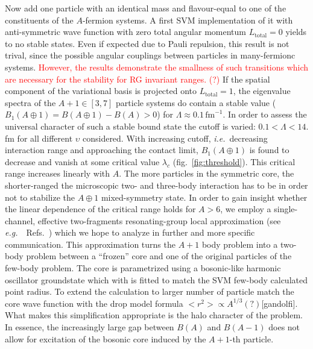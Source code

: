 \documentclass[preprint,12pt]{elsarticle}
\newcommand{\lc}{\ensuremath{\lambda_c}}
\newcommand{\fm}{\ensuremath{\,\text{fm}^{-1}}}
\newcommand{\red}[1]{\textcolor{red}{#1}}
\newcommand{\eg}{\textit{e.g.}~}
\newcommand{\ie}{\textit{i.e.}~}
\newcommand{\figref}[1]{fig.~\ref{#1}}
\begin{document}
Now add one particle with an identical mass and flavour-equal to one of the constituents of the $A$-fermion systems.
A first SVM implementation of it with anti-symmetric wave function with zero total angular momentum $L_\text{total}=0$ yields to no stable states.
Even if expected due to Pauli repulsion, this result is not trival, since the possible angular couplings between particles in many-fermionc systems.
\red{However, the results demonstrate the smallness of such transitions which are necessary for the stability for RG invariant ranges. (?)}
If the spatial component of the variational basis is projected onto $L_\text{total}=1$, the eigenvalue spectra of the $A+1\in[3,7]$ particle systems do contain a stable value ($B_1(A\oplus 1)=B(A\oplus 1)-B(A)>0$) for $\Lambda\approx0.1\fm$.
In order to assess the universal character of such a stable bound state the cutoff is varied: $0.1<\Lambda<14.$ fm for all different $\upsilon$ considered.
With increasing cutoff, \ie decreasing interaction range and approaching the 
contact limit, $B_1(A\oplus 1)$ is found to decrease
and vanish at some critical value $\lc$ (\figref{fig:threshold}). 
%
%
%
%
%
%
%
%
This critical range increases linearly with $A$.
The more particles in the symmetric core, the shorter-ranged the microscopic two- and three-body interaction has to be in order not to stabilize the $A\oplus 1$ mixed-symmetry state.
In order to gain insight whether the linear dependence of the critical range holds for $A>6$, we employ a single-channel, effective two-fragments resonating-group local approximation (see \eg~Refs.~\cite{PhysRev.52.1083,Naidon_2016}) which we hope to analyze in further and more specific communication. 
This approximation turns the $A+1$ body problem into a two-body problem between a ``frozen'' core and one of the original particles of the few-body problem. 
The core is parametrized using a bosonic-like harmonic oscillator groundstate which with is fitted to match the SVM few-body calculated point radius.
To extend the calculation to larger number of particle match the core wave function with the drop model formula $<r^2>\propto A^{1/3}(?)$[gandolfi].
What makes this simplification appropriate is the halo character of the problem.
In essence, the increasingly large gap between $B(A)$ and $B(A-1)$ does not allow for excitation of the bosonic core induced by the $A+1$-th particle.    
\end{document}
